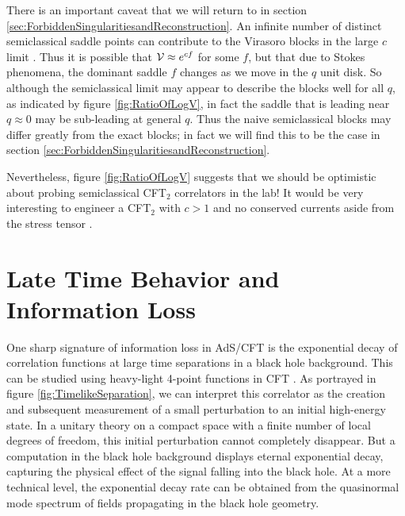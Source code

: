 There is an important caveat that we will return to in section \ref{sec:ForbiddenSingularitiesandReconstruction}.  An infinite number of distinct semiclassical saddle points can contribute to the Virasoro blocks in the large $c$ limit \cite{Fitzpatrick:2016mjq}.  Thus it is possible that ${\cal V} \approx e^{c f}$ for some $f$, but that due to Stokes phenomena, the dominant saddle $f$ changes as we move in the $q$ unit disk.  So although the semiclassical limit may appear to describe the blocks well for all $q$, as indicated by figure \ref{fig:RatioOfLogV}, in fact the saddle that is leading near $q \approx 0$ may be sub-leading at general $q$.  Thus  the naive semiclassical blocks may differ greatly from the exact blocks; in fact we will find this to be the case in section \ref{sec:ForbiddenSingularitiesandReconstruction}.  

Nevertheless, figure \ref{fig:RatioOfLogV} suggests that we should be optimistic about probing semiclassical CFT$_2$ correlators in the lab!  It would be very interesting to engineer a CFT$_2$  with $c > 1$  and no conserved currents aside from the stress tensor \cite{Plamadeala:2014roa}.




\section{Late Time Behavior and Information Loss}
\label{sec:LateTime}



One sharp signature of information loss in AdS/CFT \cite{Maldacena:2001kr} is the exponential decay of correlation functions at large time separations in a black hole background.  This can be studied using heavy-light 4-point functions in CFT \cite{Fitzpatrick:2014vua}.  As portrayed in figure \ref{fig:TimelikeSeparation}, we can interpret this correlator as the creation and subsequent measurement of a small perturbation to an initial high-energy state.  In a unitary theory on a compact space with a finite number of local degrees of freedom, this initial perturbation cannot completely disappear.  But a computation in the black hole background displays eternal exponential decay, capturing the physical effect of the signal falling into the black hole.  At a more technical level, the exponential decay rate can be obtained from the quasinormal mode spectrum of fields propagating in the black hole geometry.

